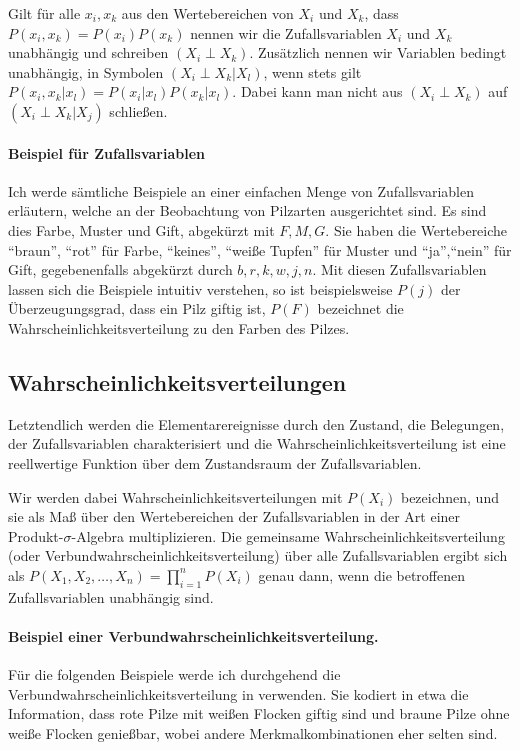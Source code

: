 \documentclass{llncs}
\begin{document}
Gilt für alle $x_i, x_k$ aus den Wertebereichen von $X_i$ und $X_k$, dass $P(x_i,x_k) = P(x_i) P(x_k)$ nennen wir die Zufallsvariablen $X_i$ und $X_k$ unabhängig und schreiben $(X_i \perp X_k)$. Zusätzlich nennen wir Variablen bedingt unabhängig, in Symbolen $(X_i \perp X_k | X_l)$, wenn stets gilt $P(x_i,x_k|x_l) = P(x_i|x_l) P(x_k|x_l)$. Dabei kann man nicht aus $(X_i \perp X_k)$ auf $(X_i \perp X_k | X_j)$ schließen. 

\paragraph{Beispiel für Zufallsvariablen} Ich werde sämtliche Beispiele an einer einfachen Menge von Zufallsvariablen erläutern, welche an der Beobachtung von Pilzarten ausgerichtet sind. Es sind dies Farbe, Muster und Gift, abgekürzt mit $F,M,G$. Sie haben die Wertebereiche "`braun"', "`rot"' für Farbe, "`keines"', "`weiße Tupfen"' für Muster und "`ja"',"`nein"' für Gift, gegebenenfalls abgekürzt durch $b,r,k,w,j,n$. Mit diesen Zufallsvariablen lassen sich die Beispiele intuitiv verstehen, so ist beispielsweise $P(j)$ der Überzeugungsgrad, dass ein Pilz giftig ist, $P(F)$ bezeichnet die Wahrscheinlichkeitsverteilung zu den Farben des Pilzes. 

\subsection{Wahrscheinlichkeitsverteilungen}

Letztendlich werden die Elementarereignisse durch den Zustand, die Belegungen, der Zufallsvariablen charakterisiert und die Wahrscheinlichkeitsverteilung ist eine reellwertige Funktion über dem Zustandsraum der Zufallsvariablen. 

Wir werden dabei Wahrscheinlichkeitsverteilungen mit $P(X_i)$ bezeichnen, und sie als Maß über den Wertebereichen der Zufallsvariablen in der Art einer Produkt-$\sigma$-Algebra multiplizieren. Die gemeinsame Wahrscheinlichkeitsverteilung (oder Verbundwahrscheinlichkeitsverteilung) über alle Zufallsvariablen ergibt sich als $ P(X_1,X_2,\dots,X_n) = \prod_{i=1}^n P(X_i) $ genau dann, wenn die betroffenen Zufallsvariablen unabhängig sind. 
\paragraph{Beispiel einer Verbundwahrscheinlichkeitsverteilung. } 

Für die folgenden Beispiele werde ich durchgehend die Verbundwahrscheinlichkeitsverteilung in  verwenden. Sie kodiert in etwa die Information, dass rote Pilze mit weißen Flocken giftig sind und braune Pilze ohne weiße Flocken genießbar, wobei andere Merkmalkombinationen eher selten sind. 
\end{document}
